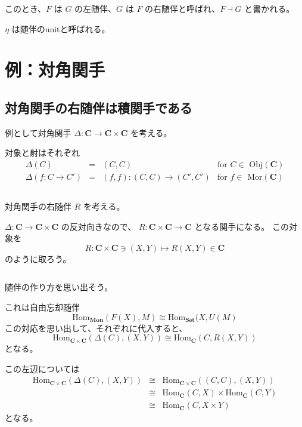 \documentclass[uplatex,a4j,12pt,dvipdfmx]{jsarticle}
\begin{document}
このとき、$F$ は $G$ の左随伴、$G$ は $F$ の右随伴と呼ばれ、$F \dashv G$ と書かれる。

$\eta$ は随伴のunitと呼ばれる。



\section{例：対角関手}

\subsection{対角関手の右随伴は積関手である}

例として対角関手 $\Delta : \mathbf{C} \to \mathbf{C} \times \mathbf{C}$ を考える。

対象と射はそれぞれ
\[
	\begin{array}{rclr}
		\Delta(C)          & = & (C, C)                    & \text{for $C \in$ Obj}(\mathbf{C}) \\
		\Delta(f:C \to C') & = & (f,f) : (C,C) \to (C',C') & \text{for $f \in$ Mor}(\mathbf{C})
	\end{array}
\]

${}$

対角関手の右随伴 $R$ を考える。

$\Delta : \mathbf{C} \to \mathbf{C} \times \mathbf{C}$
の反対向きなので、
$R : \mathbf{C} \times \mathbf{C} \to \mathbf{C}$
となる関手になる。
この対象を
$$
	R : \mathbf{C} \times \mathbf{C} \ni (X,Y) \mapsto R(X,Y) \in \mathbf{C}
$$
のように取ろう。

${}$

随伴の作り方を思い出そう。

これは自由忘却随伴
$$
	\mathrm{Hom}_{\mathbf{Mon}}(F(X), M) \cong \mathrm{Hom}_{\mathbf{Set}}(X, U(M)
$$
この対応を思い出して、それぞれに代入すると、
$$
	\mathrm{Hom}_{\mathbf{C} \times \mathbf{C}}(\Delta(C), (X,Y)) \cong \mathrm{Hom}_{\mathbf{C}}(C, R(X,Y))
$$
となる。

この左辺については
\[
	\begin{array}{rcl}
		\mathrm{Hom}_{\mathbf{C} \times \mathbf{C}}(\Delta(C), (X,Y))
		 & \cong &
		\mathrm{Hom}_{\mathbf{C} \times \mathbf{C}}((C,C), (X,Y))
		\\ &\cong&
		\mathrm{Hom}_{\mathbf{C}}(C, X)
		\times
		\mathrm{Hom}_{\mathbf{C}}(C, Y)
		\\ &\cong&
		\mathrm{Hom}_{\mathbf{C}}(C, X \times Y)
	\end{array}
\]
となる。
\end{document}

